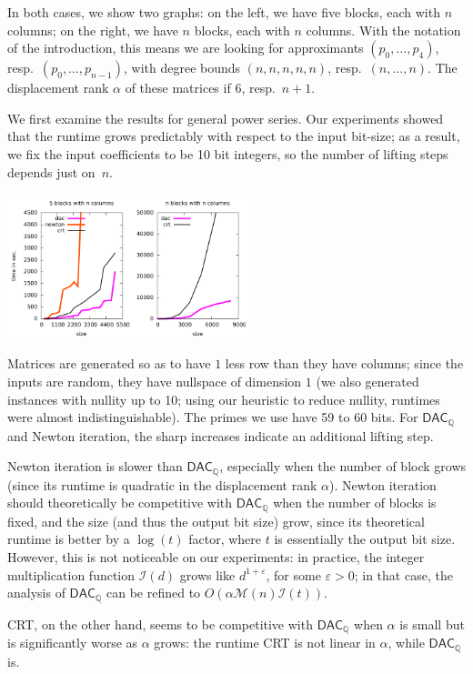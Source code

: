 \documentclass[sigconf]{acmart}
\newcommand{\Q}{\ensuremath{\mathbb{Q}}}
\newcommand{\M}{\ensuremath{\mathscr{M}}}
\newcommand{\I}{\ensuremath{\mathscr{I}}}
\newcommand{\DACQ}{\ensuremath{\mathsf{DAC}_\Q}}
\theoremstyle{acmdefinition}
\begin{document}
In both cases, we show two graphs: on the left, we have five blocks,
each with $n$ columns; on the right, we have $n$ blocks, each with $n$
columns.  With the notation of the introduction, this means we are
looking for approximants $(p_0,\dots,p_4)$, resp.\
$(p_0,\dots,p_{n-1})$, with degree bounds $(n,n,n,n,n)$, resp.\
$(n,\dots,n)$. The displacement rank $\alpha$ of these matrices if
$6$, resp.\ $n+1$.

We first examine the results for general power series. Our experiments
showed that the runtime grows predictably with respect to the input
bit-size; as a result, we fix the input coefficients to be 10 bit
integers, so the number of lifting steps depends just on~$n$.

\includegraphics[width=7cm]{plots/compare-general.pdf}

Matrices are generated so as to have $1$ less row than they have
columns; since the inputs are random, they have nullspace of dimension
$1$ (we also generated instances with nullity up to 10; using our
heuristic to reduce nullity, runtimes were almost
indistinguishable). The primes we use have 59 to 60 bits.  For $\DACQ$
and Newton iteration, the sharp increases indicate an additional
lifting step.

Newton iteration is slower than $\DACQ$, especially when the number of
block grows (since its runtime is quadratic in the displacement rank
$\alpha$). Newton iteration should theoretically be competitive with
$\DACQ$ when the number of blocks is fixed, and the size (and thus the
output bit size) grow, since its theoretical runtime is better by a
$\log(t)$ factor, where $t$ is essentially the output bit
size. However, this is not noticeable on our experiments: in practice,
the integer multiplication function $\I(d)$ grows like
$d^{1+\varepsilon}$, for some $\varepsilon > 0$; in that case, the
analysis of $\DACQ$ can be refined to $O(\alpha \M(n) \I(t))$. 

CRT, on the other hand, seems to be competitive with $\DACQ$ when
$\alpha$ is small but is significantly worse as $\alpha$ grows: the
runtime CRT is not linear in $\alpha$, while $\DACQ$ is. 
\end{document}
